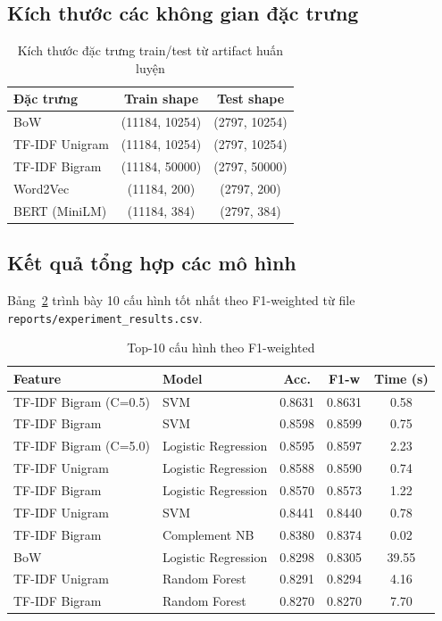 \subsection{Kích thước các không gian đặc trưng}
\begin{table}[H]
\centering
\caption{Kích thước đặc trưng train/test từ artifact huấn luyện}
\label{tab:feature_shape}
\begin{tabular}{lcc}
\toprule
\textbf{Đặc trưng} & \textbf{Train shape} & \textbf{Test shape} \\
\midrule
BoW & (11184, 10254) & (2797, 10254) \\
TF-IDF Unigram & (11184, 10254) & (2797, 10254) \\
TF-IDF Bigram & (11184, 50000) & (2797, 50000) \\
Word2Vec & (11184, 200) & (2797, 200) \\
BERT (MiniLM) & (11184, 384) & (2797, 384) \\
\bottomrule
\end{tabular}
\end{table}

\subsection{Kết quả tổng hợp các mô hình}
Bảng~\ref{tab:top10} trình bày 10 cấu hình tốt nhất theo F1-weighted từ file \texttt{reports/experiment\_results.csv}.

\begin{table}[H]
\centering
\caption{Top-10 cấu hình theo F1-weighted}
\label{tab:top10}
\begin{tabular}{p{3.4cm}p{2.6cm}ccc}
\toprule
\textbf{Feature} & \textbf{Model} & \textbf{Acc.} & \textbf{F1-w} & \textbf{Time (s)} \\
\midrule
TF-IDF Bigram (C=0.5) & SVM & 0.8631 & 0.8631 & 0.58 \\
TF-IDF Bigram & SVM & 0.8598 & 0.8599 & 0.75 \\
TF-IDF Bigram (C=5.0) & Logistic Regression & 0.8595 & 0.8597 & 2.23 \\
TF-IDF Unigram & Logistic Regression & 0.8588 & 0.8590 & 0.74 \\
TF-IDF Bigram & Logistic Regression & 0.8570 & 0.8573 & 1.22 \\
TF-IDF Unigram & SVM & 0.8441 & 0.8440 & 0.78 \\
TF-IDF Bigram & Complement NB & 0.8380 & 0.8374 & 0.02 \\
BoW & Logistic Regression & 0.8298 & 0.8305 & 39.55 \\
TF-IDF Unigram & Random Forest & 0.8291 & 0.8294 & 4.16 \\
TF-IDF Bigram & Random Forest & 0.8270 & 0.8270 & 7.70 \\
\bottomrule
\end{tabular}
\end{table}

